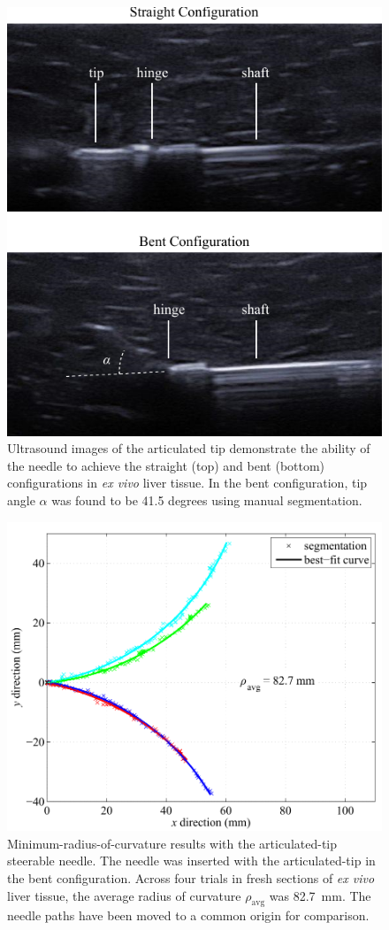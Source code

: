 \begin{figure}[!t]
\centering
\includegraphics[width = 0.65\columnwidth]{Images/Chapter3/ArticulatedTipUS/ArticulatedTipUS}%
\caption[Ultrasound images of the articulated tip]{Ultrasound images of the articulated tip demonstrate the ability of the needle to achieve the straight (top) and bent (bottom) configurations in \textit{ex vivo} liver tissue. In the bent configuration, tip angle $\alpha$ was found to be 41.5 degrees using manual segmentation.}
\label{fig:ArticulatedTipUS}
\end{figure}

\begin{figure}[!t]
\centering
\includegraphics[width=0.75\columnwidth]{Images/Chapter3/ArticulatedTipMaxCurvature/ArticulatedTipMaxCurvature}
\caption[Minimum-$\rho$ results with the articulated-tip needle]{Minimum-radius-of-curvature results with the articulated-tip steerable needle. The needle was inserted with the articulated-tip in the bent configuration. Across four trials in fresh sections of \textit{ex vivo} liver tissue, the average radius of curvature $\rho_{\text{avg}}$ was 82.7~mm. The needle paths have been moved to a common origin for comparison.}
\label{fig:ArticulatedMaxCurvature}
\end{figure}  

